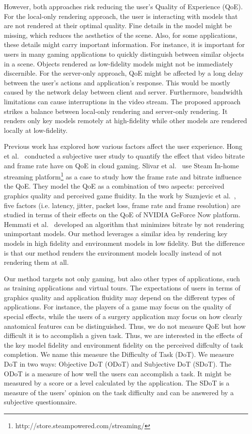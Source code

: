 However, both approaches risk reducing the user's Quality of Experience (QoE). For the local-only rendering approach, the user is interacting with models that are not rendered at their optimal quality. Fine details in the model might be missing, which reduces the aesthetics of the scene. Also, for some applications, these details might carry important information. For instance, it is important for users in many gaming applications to quickly distinguish between similar objects in a scene. Objects rendered as low-fidelity models might not be immediately discernible. For the server-only approach, QoE might be affected by a long delay between the user's actions and application's response. This would be mostly caused by the network delay between client and server. Furthermore, bandwidth limitations can cause interruptions in the video stream.
The proposed approach strikes a balance between local-only rendering and server-only rendering. It renders only key models remotely at high-fidelity while other models are rendered locally at low-fidelity. 

Previous work has explored how various factors affect the user experience. Hong et al.~\cite{hong2015user-study} conducted a subjective user study to quantify the effect that video bitrate and frame rate have on QoE in cloud gaming.
Slivar et al.~\cite{slivar2015qoe} use Steam In-home streaming platform\footnote{http://store.steampowered.com/streaming/} as a case to study how the frame rate and bitrate influence the QoE. They model the QoE as a combination of two aspects: perceived graphics quality and perceived game fluidity.
In the work by Suznjevic et al.~\cite{suznjevic2016}, five factors (i.e. latency, jitter, packet loss, frame rate and frame resolution) are studied in terms of their effects on the QoE of NVIDIA GeForce Now platform.
Hemmati et al.~\cite{hemmati2013bitrate} developed an algorithm that minimizes bitrate by not rendering unimportant models. Our method leverages a similar idea by rendering key models in high fidelity and environment models in low fidelity. But the difference is that our method renders the environment models locally instead of not rendering them at all.

Our method targets not only gaming, but also other types of applications, such as training applications and virtual tours. The expectations of users in terms of graphics quality and application fluidity may depend on the different types of applications. For instance, the players of a game may focus on the quality of special effects, while the users of a surgery application may focus on how clearly anatomical features can be distinguished. Thus, we do not measure QoE but how difficult it is to accomplish a given task. Thus, we are interested in the effects of the key model fidelity and environment fidelity on the perceived diffculty of task completion. We name this measure the Difficulty of Task (DoT). We measure DoT in two ways: Objective DoT (ODoT) and Subjective DoT (SDoT).
The ODoT is a measure of how well the users can accomplish a task. It might be measured by a score or a level calculated by the application.
The SDoT is a measure of the users' opinion on the task difficulty and can be answered by a subjective questionnaire.

